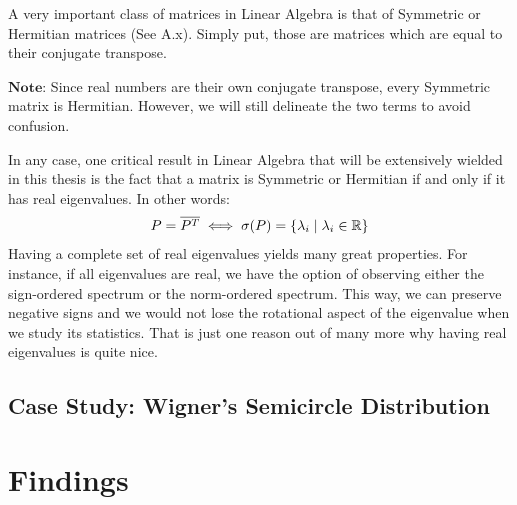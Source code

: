A very important class of matrices in Linear Algebra is that of Symmetric or Hermitian matrices (See A.x). Simply put, those are matrices which are equal to their conjugate transpose. 

$\textbf{Note:}$ Since real numbers are their own conjugate transpose, every Symmetric matrix is Hermitian. However, we will still delineate the two terms to avoid confusion.

In any case, one critical result in Linear Algebra that will be extensively wielded in this thesis is the fact that a matrix is Symmetric or Hermitian if and only if it has real eigenvalues. In other words:
\begin{align*}
P = \overline{P^{T}} \iff \sigma(P) = \{\lambda_i \mid \lambda_i \in \mathbb{R}\}
\end{align*}
Having a complete set of real eigenvalues yields many great properties. For instance, if all eigenvalues are real, we have the option of observing either the sign-ordered spectrum or the norm-ordered spectrum. This way, we can preserve negative signs and we would not lose the rotational aspect of the eigenvalue when we study its statistics. That is just one reason out of many more why having real eigenvalues is quite nice.

\subsection{Case Study: Wigner's Semicircle Distribution}



\section{Findings}
